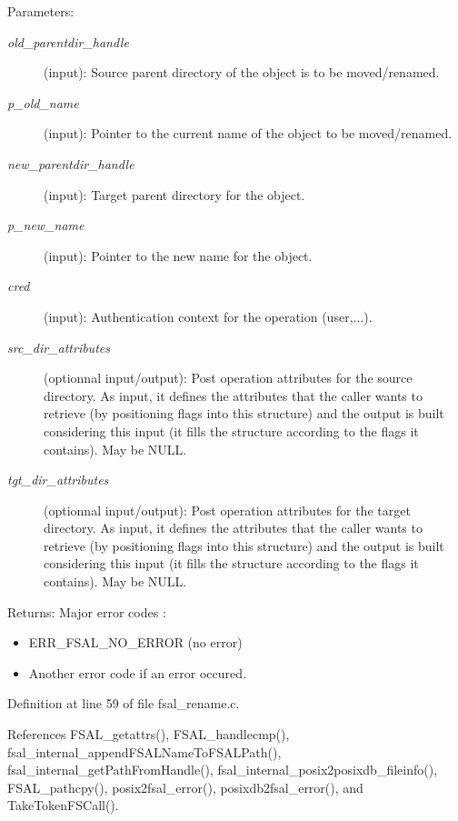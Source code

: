 \begin{Desc}
\item[Parameters:]
\begin{description}
\item[{\em old\_\-parentdir\_\-handle}](input): Source parent directory of the object is to be moved/renamed. \item[{\em p\_\-old\_\-name}](input): Pointer to the current name of the object to be moved/renamed. \item[{\em new\_\-parentdir\_\-handle}](input): Target parent directory for the object. \item[{\em p\_\-new\_\-name}](input): Pointer to the new name for the object. \item[{\em cred}](input): Authentication context for the operation (user,...). \item[{\em src\_\-dir\_\-attributes}](optionnal input/output): Post operation attributes for the source directory. As input, it defines the attributes that the caller wants to retrieve (by positioning flags into this structure) and the output is built considering this input (it fills the structure according to the flags it contains). May be NULL. \item[{\em tgt\_\-dir\_\-attributes}](optionnal input/output): Post operation attributes for the target directory. As input, it defines the attributes that the caller wants to retrieve (by positioning flags into this structure) and the output is built considering this input (it fills the structure according to the flags it contains). May be NULL.\end{description}
\end{Desc}
\begin{Desc}
\item[Returns:]Major error codes :\begin{itemize}
\item ERR\_\-FSAL\_\-NO\_\-ERROR (no error)\item Another error code if an error occured. \end{itemize}
\end{Desc}


Definition at line 59 of file fsal\_\-rename.c.

References FSAL\_\-getattrs(), FSAL\_\-handlecmp(), fsal\_\-internal\_\-appendFSALNameToFSALPath(), fsal\_\-internal\_\-getPathFromHandle(), fsal\_\-internal\_\-posix2posixdb\_\-fileinfo(), FSAL\_\-pathcpy(), posix2fsal\_\-error(), posixdb2fsal\_\-error(), and TakeTokenFSCall().